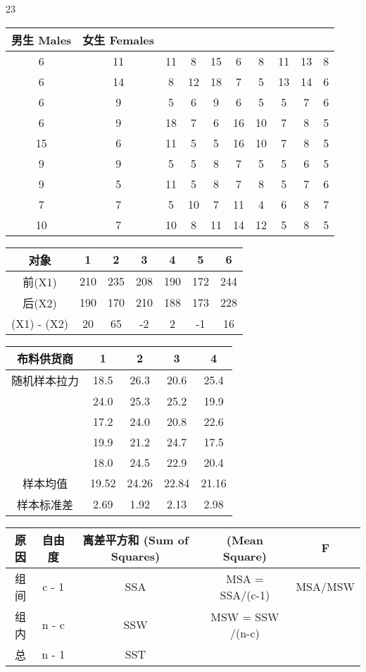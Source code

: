 \documentclass{book}        %
\begin{document}
23

\begin{tabular}{|c|c|c|c|c|c|c|c|c|c|}
\hline
\multirow{5}{*}{男生 Males}&\multirow{5}{*}{女生 Females }\\
\hline
6&11&11&8&15&6&8&11&13&8\\
\hline
6&14&8&12&18&7&5&13&14&6\\
\hline
6&9&5&6&9&6&5&5&7&6\\
\hline
6&9&18&7&6&16&10&7&8&5\\
\hline
15&6&11&5&5&16&10&7&8&5\\
\hline
9&9&5&5&8&7&5&5&6&5\\
\hline
9&5&11&5&8&7&8&5&7&6\\
\hline
7&7&5&10&7&11&4&6&8&7\\
\hline
10&7&10&8&11&14&12&5&8&5\\
\hline
\end{tabular}

\begin{tabular}{|c|c|c|c|c|c|c|}
\hline
对象&1&2&3&4&5&6\\
\hline
前(X1)&210&235&208&190&172&244\\
\hline
后(X2)&190&170&210&188&173&228\\
\hline
(X1) - (X2)&20&65&-2&2&-1&16\\
\hline
\end{tabular}


\begin{tabular}{|c|c|c|c|c|}
\hline
布料供货商&1&2&3&4\\
\hline
随机样本拉力&18.5&26.3&20.6&25.4\\
\hline
\:&24.0&25.3&25.2&19.9\\
\hline
\:&17.2&24.0&20.8&22.6\\
\hline
\:&19.9&21.2&24.7&17.5\\
\hline
\:&18.0&24.5&22.9&20.4\\
\hline
样本均值&19.52&24.26&22.84&21.16\\
\hline
样本标准差&2.69&1.92&2.13&2.98\\
\hline
\end{tabular}


\begin{tabular}{|c|c|c|c|c|}
\hline
原因&自由度&离差平方和 (Sum of Squares)&(Mean Square)&F\\
\hline
组间&c - 1&SSA&MSA = SSA/(c-1)&MSA/MSW \\
\hline
组内&n - c&SSW&MSW = SSW /(n-c)&\:\\
\hline
总&n - 1&SST&\:&\:\\
\hline
\end{tabular}
\end{document}
